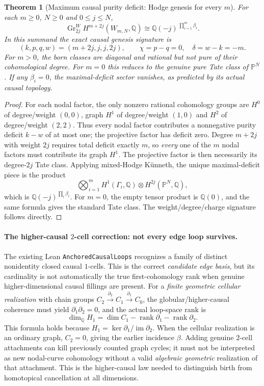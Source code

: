 \documentclass[11pt]{article}
\newtheorem{theorem}{Theorem}
\begin{document}
\begin{theorem}[Maximum causal purity deficit: Hodge genesis for every $m$]
For each $m\geq0$, $N\geq0$ and $0\leq j\leq N$,
\[
\boxed{\quad
\operatorname{Gr}^{W}_{2j}H^{m+2j}(W_{m,N},\mathbb Q)
  \cong\mathbb Q(-j)^{\,\prod_{i=1}^{m}\beta_i}.
\quad} \tag{6}
\]
In this summand the exact causal genesis signature is
\[
(k,p,q,w)=(m+2j,j,j,2j), \qquad
\boxed{\chi=p-q=0,\quad \delta=w-k=-m.}  \tag{7}
\]
For $m>0$, the born classes are diagonal and rational but not
pure of their cohomological degree. For $m=0$ this reduces to
the genuine pure Tate class of $\mathbb P^N$.
If any $\beta_i=0$, the maximal-deficit sector vanishes, as
predicted by its \emph{actual} causal topology.
\end{theorem}
\begin{proof}
For each nodal factor, the only nonzero rational cohomology
groups are $H^0$ of degree/weight $(0,0)$,
graph $H^1$ of degree/weight $(1,0)$ and
$H^2$ of degree/weight $(2,2)$.
Thus every nodal factor contributes a nonnegative purity
deficit $k-w$ of at most one; the projective factor has
deficit zero. Degree $m+2j$ with weight $2j$ requires
total deficit exactly $m$, so \emph{every} one of the $m$
nodal factors must contribute its graph $H^1$. The
projective factor is then necessarily its degree-$2j$
Tate class. Applying mixed-Hodge K\"unneth, the unique
maximal-deficit piece is the product
\[
 \bigotimes_{i=1}^{m}H^1(\Gamma_i,\mathbb Q)
    \otimes H^{2j}(\mathbb P^N,\mathbb Q),
\]
which is $\mathbb Q(-j)^{\prod_i\beta_i}$.
For $m=0$, the empty tensor product is $\mathbb Q(0)$,
and the same formula gives the standard Tate class.
The weight/degree/charge signature follows directly.
\end{proof}

\paragraph{The higher-causal $2$-cell correction: not every edge loop survives.}
The existing Lean \texttt{AnchoredCausalLoops} recognizes a family of
distinct nonidentity closed causal $1$-cells. This is the
correct \emph{candidate edge basis}, but its cardinality is not
automatically the true first-cohomology rank when genuine
higher-dimensional causal fillings are present.
For a \emph{finite geometric cellular realization}
with chain groups $C_2\xrightarrow{\partial_2} C_1
\xrightarrow{\partial_1} C_0$, the globular/higher-causal
coherence must yield $\partial_1\partial_2=0$, and
the actual loop-space rank is
\[
\boxed{\quad
 \dim_{\mathbb Q}H_1
 =\dim C_1-\operatorname{rank}\partial_1
           -\operatorname{rank}\partial_2.
\quad} \tag{8}
\]
This formula holds because
$H_1=\ker\partial_1/\operatorname{im}\partial_2$.
When the cellular realization is an ordinary graph,
$C_2=0$, giving the earlier incidence $\beta$.
Adding genuine $2$-cell attachments can kill previously
counted graph cycles; it must not be interpreted as
new nodal-curve cohomology without a valid \emph{algebraic
geometric} realization of that attachment. This is the
higher-causal law needed to distinguish birth from
homotopical cancellation at all dimensions.
\end{document}
